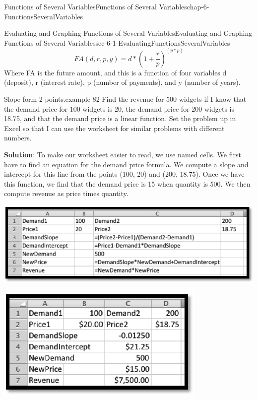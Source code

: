 \documentclass[oneside,10pt,]{book}
\newcommand{\terminology}[1]{\textbf{#1}}
\numberwithin{equation}{section}
\begin{document}
\begin{chapterptx}{Functions of Several Variables}{}{Functions of Several Variables}{}{}{chap-6-FunctionsSeveralVariables}
\begin{sectionptx}{Evaluating and Graphing Functions of Several Variables}{}{Evaluating and Graphing Functions of Several Variables}{}{}{sec-6-1-EvaluatingFunctionsSeveralVariables}
%
\begin{equation*}
FA(d,r,p,y)=d*\left(1+\frac{r}{p}\right)^{(y*p)}
\end{equation*}
\hypertarget{p-2118}{}%
Where FA is the future amount, and this is a function of four variables d (deposit), r (interest rate), p (number of payments), and y (number of years).%
\begin{example}{Slope form 2 points.}{example-82}%
\hypertarget{p-2119}{}%
Find the revenue for 500 widgets if I know that the demand price for 100 widgets is \textdollar{}20, the demand price for 200 widgets is \textdollar{}18.75, and that the demand price is a linear function.  Set the problem up in Excel so that I can use the worksheet for similar problems with different numbers.%
\par
\hypertarget{p-2120}{}%
\terminology{Solution}: To make our worksheet easier to read, we use named cells.  We first have to find an equation for the demand price formula.  We compute a slope and intercept for this line from the points (100, 20) and (200, 18.75).  Once we have this function, we find that the demand price is \textdollar{}15 when quantity is 500.  We then compute revenue as price times quantity.%
\begin{sidebyside}{1}{0.2}{0.2}{0}%
\begin{sbspanel}{0.6}%
\includegraphics[width=1\linewidth]{images/sec-6-1-3.png}
\end{sbspanel}%
\end{sidebyside}%
\begin{sidebyside}{1}{0.3}{0.3}{0}%
\begin{sbspanel}{0.4}%
\includegraphics[width=1\linewidth]{images/sec-6-1-4.png}

\end{sbspanel}
\end{sidebyside}
\end{example}
\end{sectionptx}
\end{chapterptx}
\end{document}
